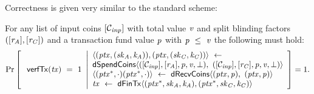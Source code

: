 Correctness is given very similar to the standard scheme:

\begin{definition}
    \label{def:atom:ext-tx-scheme-correctness}
    For any list of input coins $[\mathcal{C}_{\mathit{inp}}]$ with total value $\mathit{v}$ and split blinding factors
    $([\mathit{r}_{\mathit{A}}], [\mathit{r}_{\mathit{C}}])$ and a transaction fund value $\mathit{p}$ with $\mathit{p} ~\leq~ \mathit{v}$ the following must hold:
    \[
        \Pr\left[
        \begin{array}{c}
            \: \mathsf{verfTx}(\mathit{tx}) ~=~ 1
        \end{array}
        \middle\vert
        \begin{array}{l}
            \langle (\mathit{ptx}, (\mathit{sk}_{\mathit{A}}, \mathit{\mathit{k}_{\mathit{A}}})), (\mathit{ptx}, (\mathit{sk}_{\mathit{C}}, \mathit{\mathit{k}_{\mathit{C}}})) \rangle ~\leftarrow~ \\
            \mathsf{dSpendCoins} \langle ([\mathcal{C}_{\mathit{inp}}],[\mathit{r}_{\mathit{A}}],\mathit{p},\mathit{v},\bot) ,~ ([\mathcal{C}_{\mathit{inp}}],[\mathit{r}_{\mathit{C}}],\mathit{p},\mathit{v},\bot) \rangle \\
            \langle (\mathit{ptx}^*, \cdot)(\mathit{ptx}^*, \cdot) \rangle ~\leftarrow~ \mathsf{dRecvCoins} \langle(\mathit{ptx},\mathit{p}) ,~ (\mathit{ptx},\mathit{p}) \rangle \\
            \mathit{tx} ~\leftarrow~ \mathsf{dFinTx} \langle(\mathit{ptx}^*,\mathit{sk}_{\mathit{A}},\mathit{\mathit{k}_{\mathit{A}}}),(\mathit{ptx}^*,\mathit{sk}_{\mathit{C}},\mathit{\mathit{k}_{\mathit{C}}})\rangle
        \end{array}
        \right]=1.
    \]
\end{definition}

